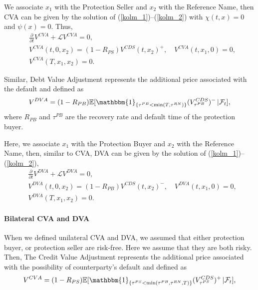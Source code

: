 We associate $x_1$ with the Protection Seller and $x_2$ with the Reference Name, then CVA can be given by the solution of  (\ref{kolm_1})--(\ref{kolm_2})  with $\chi(t, x) = 0$ and $\psi(x) = 0$. Thus,
\begin{equation}
\begin{aligned}
		& \frac{\partial}{\partial t} V^{CVA}+ \mathcal{L} V^{CVA} = 0, \\
		& V^{CVA}(t, 0, x_2) = (1 - R_{PS}) V^{CDS}(t, x_2)^{+}, \quad V^{CVA}(t, x_1, 0) = 0, \\
		& V^{CVA}(T, x_1, x_2) = 0.
\end{aligned}
\end{equation}

Similar, Debt Value Adjustment represents the additional price associated with the default and defined as
\begin{equation}
	V^{DVA} = (1- R_{PB}) \mathbb{E}[\mathbbm{1}_{\{\tau^{PB} < \min(T, \tau^{RN}) \}} (V_{\tau^{PB}}^{CDS})^{-} \, | \mathcal{F}_t],
\end{equation}
where $R_{PB}$ and $\tau^{PB}$ are the recovery rate and default time of the protection buyer.

Here, we associate $x_1$ with the Protection Buyer and $x_2$ with the Reference Name, then, similar to CVA,  DVA can be given by the solution of  (\ref{kolm_1})--(\ref{kolm_2}),
\begin{equation}
\begin{aligned}
		& \frac{\partial}{\partial t} V^{DVA}+ \mathcal{L} V^{DVA} = 0, \\
		& V^{DVA}(t, 0, x_2) = (1 - R_{PB}) V^{CDS}(t, x_2)^{-}, \quad V^{DVA}(t, x_1, 0) = 0, \\
		& V^{DVA}(T, x_1, x_2) = 0.
\end{aligned}
\end{equation}

\paragraph{Bilateral CVA and DVA}

When we defined unilateral CVA and DVA, we assumed that either protection  buyer, or protection seller are risk-free. Here we assume that they are both risky. Then, 
The Credit Value Adjustment represents the additional price associated with the possibility of counterparty's default and defined as
\begin{equation}
	V^{CVA} = (1 - R_{PS}) \mathbb{E}[\mathbbm{1}_{\{\tau^{PS} < \min(\tau^{PB}, \tau^{RN}, T)\}} (V^{CDS}_{\tau^{PS}})^{+} \, | \mathcal{F}_t],
\end{equation} 

